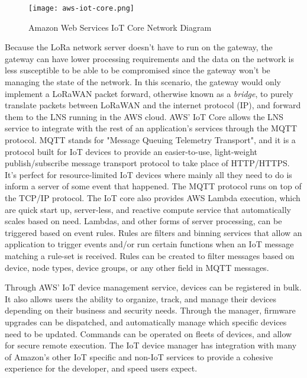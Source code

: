 \begin{figure}
  \centering
  \texttt{[image: aws-iot-core.png]}
  \caption{Amazon Web Services IoT Core Network Diagram}
  \label{aws-iot-core}
\end{figure}

Because the LoRa network server doesn't have to run on the gateway, the gateway can have lower
processing requirements and the data on the network is less susceptible to be able to be compromised
since the gateway won't be managing the state of the network. In this scenario, the gateway would
only implement a LoRaWAN packet forward, otherwise known as a \emph{bridge}, to purely translate
packets between LoRaWAN and the internet protocol (IP), and forward them to the LNS running in the
AWS cloud. AWS' IoT Core allows the LNS service to integrate with the rest of an application's
services through the MQTT protocol. MQTT stands for "Message Queuing Telemetry Transport", and it is
a protocol built for IoT devices to provide an easier-to-use, light-weight publish/subscribe message
transport protocol to take place of HTTP/HTTPS. It's perfect for resource-limited IoT devices where
mainly all they need to do is inform a server of some event that happened. The MQTT protocol runs on
top of the TCP/IP protocol. The IoT core also provides AWS Lambda execution, which are quick start
up, server-less, and reactive compute service that automatically scales based on need. Lambdas, and
other forms of server processing, can be triggered based on event rules. Rules are filters and
binning services that allow an application to trigger events and/or run certain functions when an
IoT message matching a rule-set is received. Rules can be created to filter messages based on
device, node types, device groups, or any other field in MQTT messages.


Through AWS' IoT device management service, devices can be registered in bulk. It also allows users
the ability to organize, track, and manage their devices depending on their business and security
needs. Through the manager, firmware upgrades can be dispatched, and automatically manage which
specific devices need to be updated. Commands can be operated on fleets of devices, and allow for
secure remote execution. The IoT device manager has integration with many of Amazon's other IoT
specific and non-IoT services to provide a cohesive experience for the developer, and speed users
expect.

